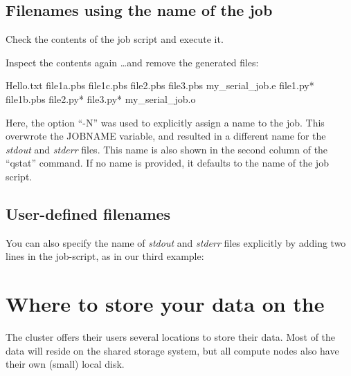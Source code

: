 \subsection{Filenames using the name of the job}

Check the contents of the job script and execute it.


\begin{prompt}
\end{prompt}

Inspect the contents again \dots and remove the generated files:

\begin{prompt}
Hello.txt  file1a.pbs  file1c.pbs  file2.pbs  file3.pbs  my_serial_job.e%
file1.py*  file1b.pbs  file2.py*   file3.py*  my_serial_job.o%
\end{prompt}

Here, the option ``-N'' was used to explicitly assign a name to the job.  This
overwrote the JOBNAME variable, and resulted in a different name for the
\emph{stdout} and \emph{stderr} files. This name is also shown in the
second column of the ``qstat'' command. If no name is provided, it defaults to
the name of the job script.

\subsection{User-defined filenames}

You can also specify the name of \emph{stdout} and \emph{stderr} files
explicitly by adding two lines in the job-script, as in our third example:


\begin{prompt}
\end{prompt}

\section{Where to store your data on the \hpc}

The \hpc cluster offers their users several locations to store their data. Most
of the data will reside on the shared storage system, but all compute nodes
also have their own (small) local disk.


